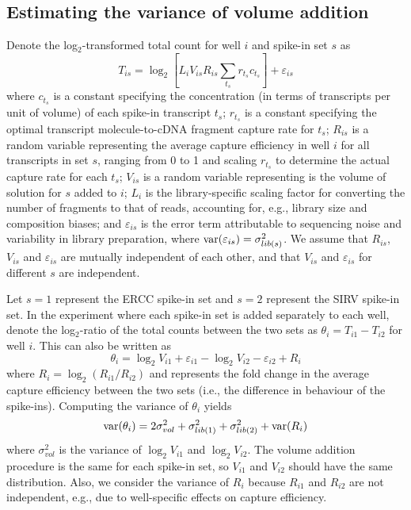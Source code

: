 \documentclass{article}
\begin{document}
\subsection{Estimating the variance of volume addition}
Denote the log$_2$-transformed total count for well $i$ and spike-in set $s$ as
\[
T_{is} = \log_2 \left[ L_i V_{is} R_{is} \sum_{t_s} r_{t_s} c_{t_s} \right] + \varepsilon_{is}
\]
where $c_{t_s}$ is a constant specifying the concentration (in terms of transcripts per unit of volume) of each spike-in transcript $t_s$;
$r_{t_s}$ is a constant specifying the optimal transcript molecule-to-cDNA fragment capture rate for $t_s$;
$R_{is}$ is a random variable representing the average capture efficiency in well $i$ for all transcripts in set $s$, ranging from 0 to 1 and scaling $r_{t_s}$ to determine the actual capture rate for each $t_s$;
$V_{is}$ is a random variable representing is the volume of solution for $s$ added to $i$;
$L_i$ is the library-specific scaling factor for converting the number of fragments to that of reads, accounting for, e.g., library size and composition biases;
and $\varepsilon_{is}$ is the error term attributable to sequencing noise and variability in library preparation, where $\mbox{var}(\varepsilon_{is})= \sigma^2_{lib(s)}$.
We assume that $R_{is}$, $V_{is}$ and $\varepsilon_{is}$ are mutually independent of each other, and that $V_{is}$ and $\varepsilon_{is}$ for different $s$ are independent.

Let $s=1$ represent the ERCC spike-in set and $s=2$ represent the SIRV spike-in set.
In the experiment where each spike-in set is added separately to each well, denote the log$_2$-ratio of the total counts between the two sets as $\theta_i = T_{i1} - T_{i2}$ for well $i$.
This can also be written as
\[
\theta_i = \log_2 V_{i1} + \varepsilon_{i1} - \log_2 V_{i2} - \varepsilon_{i2} + R_i
\]
where $R_i = \log_2(R_{i1}/R_{i2})$ and represents the fold change in the average capture efficiency between the two sets (i.e., the difference in behaviour of the spike-ins).
Computing the variance of $\theta_i$ yields
\[
\mbox{var}(\theta_i) = 2 \sigma^2_{vol} + \sigma^2_{lib(1)} + \sigma^2_{lib(2)} + \mbox{var}(R_i)
\]
where $\sigma^2_{vol}$ is the variance of $\log_2 V_{i1}$ and $\log_2 V_{i2}$.
The volume addition procedure is the same for each spike-in set, so $V_{i1}$ and $V_{i2}$ should have the same distribution.
Also, we consider the variance of $R_i$ because $R_{i1}$ and $R_{i2}$ are not independent, e.g., due to well-specific effects on capture efficiency.
\end{document}
